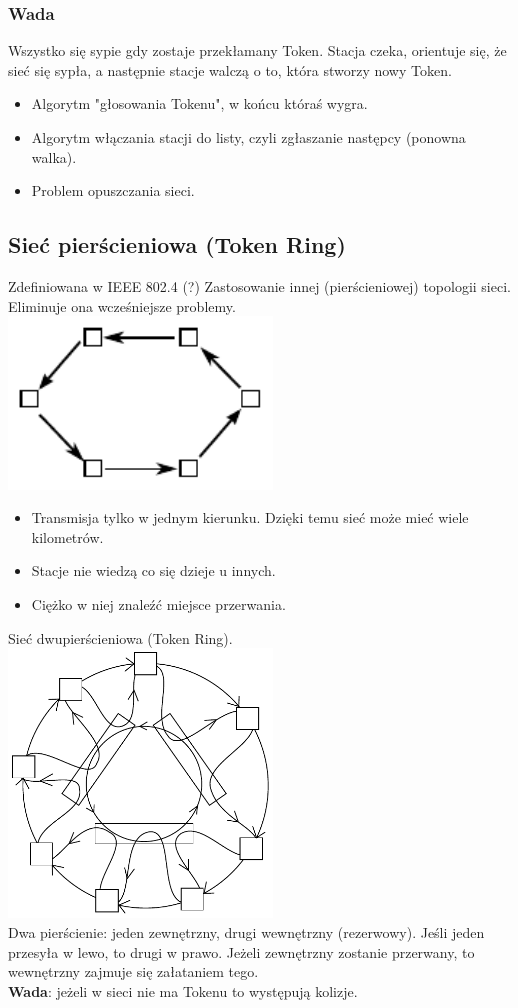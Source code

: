 \documentclass[a4paper,twoside]{article}
\begin{document}
		\subsubsection{Wada}
			Wszystko się sypie gdy zostaje przekłamany Token. Stacja czeka, orientuje się, że sieć się sypła, a następnie stacje walczą o to, która stworzy nowy Token.
			\begin{itemize}
				\item Algorytm "głosowania Tokenu", w końcu któraś wygra.
				\item Algorytm włączania stacji do listy, czyli zgłaszanie następcy (ponowna walka).
				\item Problem opuszczania sieci.
			\end{itemize}
		\subsection{Sieć pierścieniowa (Token Ring)}
			Zdefiniowana w IEEE 802.4 (?)
			Zastosowanie innej (pierścieniowej) topologii sieci. Eliminuje ona wcześniejsze problemy.\\
			\includegraphics[width=7cm]{./images/image29.pdf}
			\begin{itemize}
				\item Transmisja tylko w jednym kierunku. Dzięki temu sieć może mieć wiele kilometrów.
				\item Stacje nie wiedzą co się dzieje u innych.
				\item Ciężko w niej znaleźć miejsce przerwania.
			\end{itemize}
			Sieć dwupierścieniowa (Token Ring).\\
			\includegraphics[width=7cm]{./images/image30.pdf}\\
			Dwa pierścienie: jeden zewnętrzny, drugi wewnętrzny (rezerwowy). Jeśli jeden przesyła w lewo, to drugi w prawo. Jeżeli zewnętrzny zostanie przerwany, to wewnętrzny zajmuje się załataniem tego.\\
			\textbf{Wada}: jeżeli w sieci nie ma Tokenu to występują kolizje.
\end{document}
